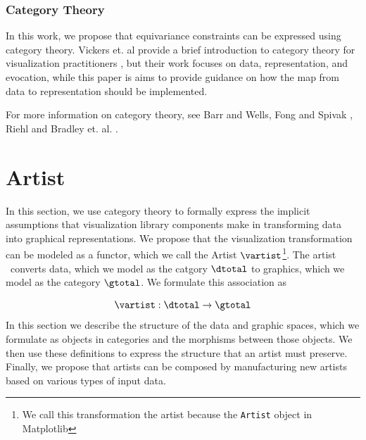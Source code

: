 \documentclass[10pt,journal,compsoc]{IEEEtran}
\theoremstyle{definition}
\theoremstyle{remark}
\begin{document}
\subsubsection{Category Theory}
\label{sec:related-work:equivariance:category}
In this work, we propose that equivariance constraints can be expressed using category theory. Vickers et. al provide a brief introduction to category theory for visualization practitioners \cite{vickersUnderstandingVisualizationFormal2013}, but their work focuses on data, representation, and evocation, while this paper is aims to provide guidance on how the map from data to representation should be implemented. 

For more information on category theory, see Barr and Wells\cite{barrCategoryTheoryComputing}, Fong and Spivak \cite{fongInvitationAppliedCategory2019}, Riehl\cite{riehlCategoryTheoryContext} and Bradley et. al. \cite{bradleyTopologyCategoricalApproach2020}.

\section{Artist} 
In this section, we use category theory to formally express the implicit assumptions that visualization library components make in transforming data into graphical representations. We propose that the visualization transformation can be modeled as a functor, which we call the \textcolor{artist}{Artist} $\mathcal{\vartist}$\footnote{We call this transformation the artist because the \texttt{Artist} object in Matplotlib\cite{hunterMatplotlib2DGraphics2007}}. The artist \vartist\ converts data, which we model as the catgory $\mathcal{\dtotal}$ to graphics, which we model as the category $\mathcal{\gtotal}$. We formulate this association as 

\begin{equation}
  \vartist: \mathcal{\dtotal} \rightarrow \mathcal{\gtotal}
  \label{eq:artist:artist}
\end{equation}
In this section we describe the structure of the data and graphic spaces, which we formulate as objects in categories and the morphisms between those objects. We then use these definitions to express the structure that an artist must preserve. Finally, we propose that artists can be composed by manufacturing new artists based on various types of input data. 
\end{document}
